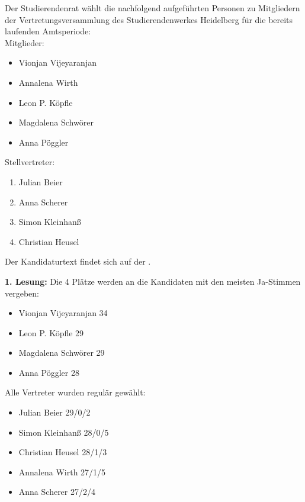 {
	Der Studierendenrat wählt die nachfolgend aufgeführten Personen zu Mitgliedern der Vertretungsversammlung des Studierendenwerkes Heidelberg für die bereits laufenden Amtsperiode:\\
	Mitglieder:
	\begin{itemize}
		\item Vionjan Vijeyaranjan
		\item Annalena Wirth
		\item Leon P. Köpfle
		\item Magdalena Schwörer
		\item Anna Pöggler
	\end{itemize}
	Stellvertreter:
	\begin{enumerate}
		\item Julian Beier
		\item Anna Scherer
		\item Simon Kleinhanß
		\item Christian Heusel
	\end{enumerate}
    Der Kandidaturtext findet sich auf der \kandidaturenseite.
}{
	\textbf{1. Lesung:}
	\ul{
	}
}
Die 4 Plätze werden an die Kandidaten mit den meisten Ja-Stimmen vergeben:
\begin{itemize}
	\item Vionjan Vijeyaranjan 34
	\item Leon P. Köpfle 29
	\item Magdalena Schwörer 29
	\item Anna Pöggler 28
\end{itemize}
Alle Vertreter wurden regulär gewählt:
\begin{itemize}
	\item Julian Beier 29/0/2
	\item Simon Kleinhanß 28/0/5
	\item Christian Heusel 28/1/3
	\item Annalena Wirth 27/1/5
	\item Anna Scherer 27/2/4
\end{itemize}


